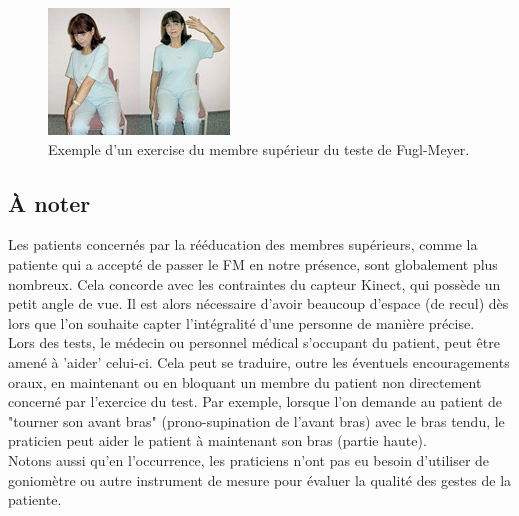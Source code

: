 \begin{figure}[h!]
\centering
\includegraphics[width=0.5\linewidth]{images/fuglmeyer_example}
\caption{Exemple d'un exercise du membre supérieur du teste de Fugl-Meyer.}
\end{figure}

        \subsection{À noter}
Les patients concernés par la rééducation des membres supérieurs, comme la patiente qui a accepté de passer 
le FM en notre présence, sont globalement plus nombreux. Cela concorde avec les contraintes du capteur Kinect, 
qui possède un petit angle de vue. Il est alors nécessaire d'avoir beaucoup d'espace (de recul) dès lors que 
l'on souhaite capter l'intégralité d'une personne de manière précise. \\
Lors des tests, le médecin ou personnel médical s'occupant du patient, peut être amené à 'aider' celui-ci.
Cela peut se traduire, outre les éventuels encouragements oraux, en maintenant ou en bloquant un membre du patient
non directement concerné par l'exercice du test. Par exemple, lorsque l'on demande au patient de "tourner son avant 
bras" (prono-supination de l'avant bras) avec le bras tendu, le praticien peut aider le patient à maintenant son bras
(partie haute).\\
Notons aussi qu'en l'occurrence, les praticiens n'ont pas eu besoin d'utiliser de goniomètre ou autre instrument de 
mesure pour évaluer la qualité des gestes de la patiente.
    
